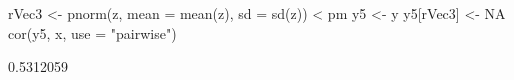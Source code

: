 \begin{Schunk}
\begin{Sinput}
 rVec3 <- pnorm(z, mean = mean(z), sd = sd(z)) < pm
 y5 <- y
 y5[rVec3] <- NA
 cor(y5, x, use = "pairwise")
\end{Sinput}
\begin{Soutput}
[1] 0.5312059
\end{Soutput}
\end{Schunk}
